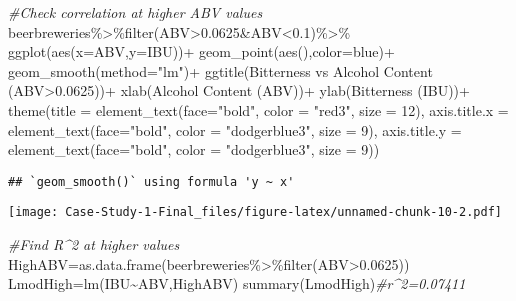 \documentclass[
]{article}
\newenvironment{Shaded}{\begin{snugshade}}{\end{snugshade}}
\newcommand{\AttributeTok}[1]{\textcolor[rgb]{0.77,0.63,0.00}{#1}}
\newcommand{\CommentTok}[1]{\textcolor[rgb]{0.56,0.35,0.01}{\textit{#1}}}
\newcommand{\DecValTok}[1]{\textcolor[rgb]{0.00,0.00,0.81}{#1}}
\newcommand{\FloatTok}[1]{\textcolor[rgb]{0.00,0.00,0.81}{#1}}
\newcommand{\FunctionTok}[1]{\textcolor[rgb]{0.00,0.00,0.00}{#1}}
\newcommand{\NormalTok}[1]{#1}
\newcommand{\OtherTok}[1]{\textcolor[rgb]{0.56,0.35,0.01}{#1}}
\newcommand{\SpecialCharTok}[1]{\textcolor[rgb]{0.00,0.00,0.00}{#1}}
\newcommand{\StringTok}[1]{\textcolor[rgb]{0.31,0.60,0.02}{#1}}
\begin{document}
\begin{Shaded}
\begin{Highlighting}[]
\CommentTok{\#Check correlation at higher ABV values}
\NormalTok{beerbreweries}\SpecialCharTok{\%\textgreater{}\%}\FunctionTok{filter}\NormalTok{(ABV}\SpecialCharTok{\textgreater{}}\FloatTok{0.0625}\SpecialCharTok{\&}\NormalTok{ABV}\SpecialCharTok{\textless{}}\FloatTok{0.1}\NormalTok{)}\SpecialCharTok{\%\textgreater{}\%}
  \FunctionTok{ggplot}\NormalTok{(}\FunctionTok{aes}\NormalTok{(}\AttributeTok{x=}\NormalTok{ABV,}\AttributeTok{y=}\NormalTok{IBU))}\SpecialCharTok{+}
  \FunctionTok{geom\_point}\NormalTok{(}\FunctionTok{aes}\NormalTok{(),}\AttributeTok{color=}\StringTok{\textquotesingle{}blue\textquotesingle{}}\NormalTok{)}\SpecialCharTok{+}
  \FunctionTok{geom\_smooth}\NormalTok{(}\AttributeTok{method=}\StringTok{"lm"}\NormalTok{)}\SpecialCharTok{+}
  \FunctionTok{ggtitle}\NormalTok{(}\StringTok{\textquotesingle{}Bitterness vs Alcohol Content (ABV\textgreater{}0.0625)\textquotesingle{}}\NormalTok{)}\SpecialCharTok{+}
  \FunctionTok{xlab}\NormalTok{(}\StringTok{\textquotesingle{}Alcohol Content (ABV)\textquotesingle{}}\NormalTok{)}\SpecialCharTok{+}
  \FunctionTok{ylab}\NormalTok{(}\StringTok{\textquotesingle{}Bitterness (IBU)\textquotesingle{}}\NormalTok{)}\SpecialCharTok{+}
  \FunctionTok{theme}\NormalTok{(}\AttributeTok{title =} \FunctionTok{element\_text}\NormalTok{(}\AttributeTok{face=}\StringTok{"bold"}\NormalTok{, }\AttributeTok{color =} \StringTok{"red3"}\NormalTok{, }\AttributeTok{size =} \DecValTok{12}\NormalTok{),}
        \AttributeTok{axis.title.x =} \FunctionTok{element\_text}\NormalTok{(}\AttributeTok{face=}\StringTok{"bold"}\NormalTok{, }\AttributeTok{color =} \StringTok{"dodgerblue3"}\NormalTok{, }\AttributeTok{size =} \DecValTok{9}\NormalTok{),}
        \AttributeTok{axis.title.y =} \FunctionTok{element\_text}\NormalTok{(}\AttributeTok{face=}\StringTok{"bold"}\NormalTok{, }\AttributeTok{color =} \StringTok{"dodgerblue3"}\NormalTok{, }\AttributeTok{size =} \DecValTok{9}\NormalTok{))}
\end{Highlighting}
\end{Shaded}

\begin{verbatim}
## `geom_smooth()` using formula 'y ~ x'
\end{verbatim}

\texttt{[image: Case-Study-1-Final\_files/figure-latex/unnamed-chunk-10-2.pdf]}

\begin{Shaded}
\begin{Highlighting}[]
\CommentTok{\#Find R\^{}2 at higher values}
\NormalTok{HighABV}\OtherTok{=}\FunctionTok{as.data.frame}\NormalTok{(beerbreweries}\SpecialCharTok{\%\textgreater{}\%}\FunctionTok{filter}\NormalTok{(ABV}\SpecialCharTok{\textgreater{}}\FloatTok{0.0625}\NormalTok{))}
\NormalTok{LmodHigh}\OtherTok{=}\FunctionTok{lm}\NormalTok{(IBU}\SpecialCharTok{\textasciitilde{}}\NormalTok{ABV,HighABV)}
\FunctionTok{summary}\NormalTok{(LmodHigh)}\CommentTok{\#r\^{}2=0.07411}
\end{Highlighting}
\end{Shaded}
\end{document}
